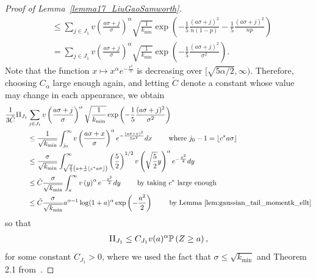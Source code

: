 \documentclass{article}
\begin{document}
\begin{proof}[Proof of Lemma~\ref{lemma17_LiuGaoSamworth}]
\begin{align*}
& \leq \sum_{j\in J_1}v\left(\frac{a\sigma + j}{\sigma}\right)^\alpha \sqrt{\frac{1}{k_{\min}}} \exp\left(-\frac15\frac{(a\sigma + j)^2}{n(1-p)} - \frac15\frac{(a\sigma + j)^2}{np}\right)\\
& = \sum_{j\in J_1} v\left(\frac{a\sigma + j}{\sigma}\right)^\alpha \sqrt{\frac{1}{k_{\min}}} \exp\left(-\frac15\frac{(a\sigma + j)^2}{\sigma^2}\right).
\end{align*}
Note that the function $x \mapsto x^\alpha e^{-\frac{x^2}{5}}$ is decreasing over $[\sqrt{5\alpha/2}, \infty)$. Therefore, choosing $C_\alpha$ large enough again, and letting $\tilde C$ denote a constant whose value may change in each appearance, we obtain %
\begin{align*}
\frac{1}{3 \tilde C}\text{I\hspace{.2mm}I}_{J_1}&  \sum_{j\in J_1} v\left(\frac{a\sigma + j}{\sigma}\right)^\alpha \sqrt{\frac{1}{k_{\min}}} \exp\left(-\frac15\frac{(a\sigma + j)^2}{\sigma^2}\right) \\
&\leq \frac{1}{\sqrt{k_{\min}}} \int_{j_0}^\infty v\left(\frac{a\sigma + x}{\sigma}\right)^\alpha e^{-\frac{(a\sigma + x)^2}{5 \sigma^2}} dx  \qquad \text{ where } j_0 - 1 = \lfloor c^* a \sigma \rfloor\\
& \leq \frac{\sigma}{\sqrt{k_{\min}}} \int_{\sqrt{\frac{2}{5}}\left(a + \frac{1}{\sigma}\lfloor c^*a \sigma\rfloor\right)}^\infty \left(\frac{5}{2}\right)^{1/2}v \left(\sqrt{\frac{5}{2}}y\right)^\alpha e^{-\frac{y^2}{2}} dy\\
& \leq \tilde C\frac{\sigma}{\sqrt{k_{\min}}} \int_{a}^\infty v \left(y\right)^\alpha e^{-\frac{y^2}{2}} dy \qquad  \text{ by taking $c^*$ large enough}\\
& \leq \tilde C \frac{\sigma}{\sqrt{k_{\min}}} a^{\alpha-1} \log(1+a)^\alpha \exp\left(-\frac{a^2}{2}\right) \qquad \text{ by Lemma~\ref{lem:gaussian_tail_momentk_ellt}}
\end{align*}
so that
\begin{align}
    \text{I\hspace{.2mm}I}_{J_1} \leq C_{J_1}v(a)^\alpha \mathbb P\left(Z \geq a\right),\label{eq_term_II_J1}
\end{align}
for some constant $C_{J_1}>0$, where we used the fact that $\sigma \leq \sqrt{k_{\min}}$ and Theorem 2.1 from~\cite{slud1977distribution}.


\end{proof}
\end{document}
